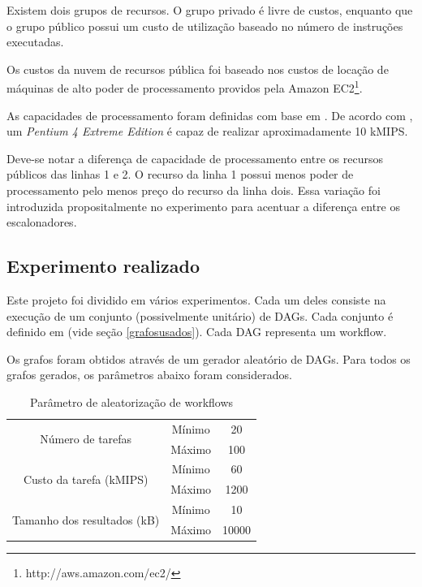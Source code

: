 \documentclass[a4paper,10pt]{article}
\begin{document}
Existem dois grupos de recursos. O grupo privado é livre de custos, enquanto que o grupo público possui
um custo de utilização baseado no número de instruções executadas. 

Os custos da nuvem de recursos pública foi baseado nos custos de locação de máquinas de alto poder de
processamento providos pela Amazon EC2\footnote{http://aws.amazon.com/ec2/}.

As capacidades de processamento foram definidas com base em \cite{ips_wiki}. De acordo com \cite{ips_wiki},
um \emph{Pentium 4 Extreme Edition} é capaz de realizar aproximadamente 10 kMIPS.

Deve-se notar a diferença de capacidade de processamento entre os recursos públicos das linhas 1 e 2.
O recurso da linha 1 possui menos poder de processamento pelo menos preço do recurso da linha dois. Essa
variação foi introduzida propositalmente no experimento para acentuar a diferença entre os escalonadores.

\subsection{Experimento realizado}

Este projeto foi dividido em vários experimentos. Cada um deles consiste na execução de um conjunto (possivelmente unitário)
de DAGs. Cada conjunto é definido em (vide seção \ref{grafosusados}). Cada DAG representa um workflow.

Os grafos foram obtidos através de um gerador aleatório de DAGs. Para todos os grafos gerados,
os parâmetros abaixo foram considerados.

\begin{table}
\centering

  \begin{tabular}{|c|c|c|}  
    \hline
    \multirow{2}{*}{Número de tarefas} & Mínimo & 20\\
                                       & Máximo & 100 \\
    \hline
    \multirow{2}{*}{Custo da tarefa (kMIPS)} & Mínimo & 60 \\
                                             & Máximo & 1200 \\
    \hline
    \multirow{2}{*}{Tamanho dos resultados (kB)} & Mínimo & 10 \\
                                                 & Máximo & 10000 \\
    \hline

  \end{tabular}
  \caption{Parâmetro de aleatorização de workflows}
  \label{tab:param_workflow}
\end{table}
\end{document}
